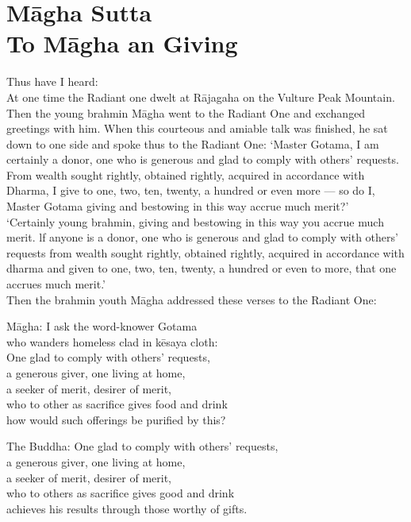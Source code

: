 \chapter{M\=agha Sutta\\ To M\=agha an Giving}
Thus have I heard:\\

At one time the Radiant one dwelt at R\=ajagaha on the Vulture Peak Mountain. Then the young brahmin M\=agha went to the Radiant One and exchanged greetings with him. When this courteous and amiable talk was finished, he sat down to one side and spoke thus to the Radiant One: `Master Gotama, I am certainly a donor, one who is generous and glad to comply with others' requests. From wealth sought rightly, obtained rightly, acquired in  accordance with Dharma, I give to one, two, ten, twenty, a hundred or even more — so do I, Master Gotama giving and bestowing in this way accrue much merit?'\\

`Certainly young brahmin, giving and bestowing in this way you accrue much merit. lf anyone is a donor, one who is generous and glad to comply with others' requests from wealth sought rightly, obtained rightly, acquired in accordance with dharma and given to one, two, ten, twenty, a hundred or even to more, that one accrues much merit.'\\

Then the brahmin youth M\=agha addressed these verses to the Radiant One:

\begin{MyDescription}{M\=agha:}
I ask the word-knower Gotama\\
who wanders homeless clad in k\=esaya cloth:\\
One glad to comply with others' requests,\\
a generous giver, one living at home,\\
a seeker of merit, desirer of merit,\\
who to other as sacriﬁce gives food and drink\\
how would such offerings be purified by this?
\end{MyDescription}

\begin{MyDescription}{The Buddha:}
One glad to comply with others' requests,\\
a generous giver, one living at home,\\
a seeker of merit, desirer of merit,\\
who to others as sacrifice gives good and drink\\
achieves his results through those worthy of gifts.
\end{MyDescription}

